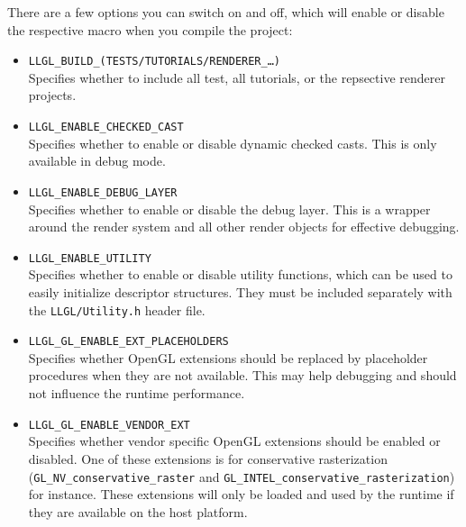 \documentclass{article}
\begin{document}
There are a few options you can switch on and off, which will enable or disable the respective macro
when you compile the project:
\begin{itemize}
	\item \texttt{LLGL\_BUILD\_(TESTS/TUTORIALS/RENDERER\_\dots)} \\
	Specifies whether to include all test, all tutorials, or the repsective renderer projects.
	
	\item \texttt{LLGL\_ENABLE\_CHECKED\_CAST} \\
	Specifies whether to enable or disable dynamic checked casts.
	This is only available in debug mode.
	
	\item \texttt{LLGL\_ENABLE\_DEBUG\_LAYER} \\
	Specifies whether to enable or disable the debug layer.
	This is a wrapper around the render system and all other render objects for effective debugging.
	
	\item \texttt{LLGL\_ENABLE\_UTILITY} \\
	Specifies whether to enable or disable utility functions, which can be used to easily initialize descriptor structures.
	They must be included separately with the \texttt{LLGL/Utility.h} header file.
	
	\item \texttt{LLGL\_GL\_ENABLE\_EXT\_PLACEHOLDERS} \\
	Specifies whether OpenGL extensions should be replaced by placeholder procedures
	when they are not available. This may help debugging and should not influence the runtime performance.
	
	\item \texttt{LLGL\_GL\_ENABLE\_VENDOR\_EXT} \\
	Specifies whether vendor specific OpenGL extensions should be enabled or disabled.
	One of these extensions is for conservative rasterization
	(\texttt{GL\_NV\_conservative\_raster} and \texttt{GL\_INTEL\_conservative\_rasterization}) for instance.
	These extensions will only be loaded and used by the runtime if they are available on the host platform.
\end{itemize}


\end{document}
